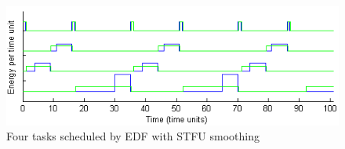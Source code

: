 \begin{figure}[htb]
\includegraphics[scale=0.64]{stfutasks.png}
\caption{Four tasks scheduled by EDF with \textsc{STFU} smoothing}
\label{fig:stfutaskplot}
\end{figure}



































